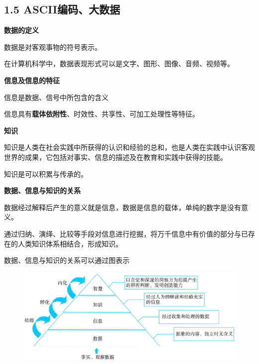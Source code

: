\setcounter{section}{1}
\setcounter{subsection}{2}
\subsection{1.5 ASCII编码、大数据}



\begin{compactenum}[1.]
\item \textbf{数据的定义}
	\begin{compactitem}
	\item 数据是对客观事物的符号表示。
	\item 在计算机科学中，数据表现形式可以是文字、图形、图像、音频、视频等。
	\end{compactitem}
\item \textbf{信息及信息的特征}
	\begin{compactitem}
	\item 信息是数据、信号中所包含的含义
	\item 信息具有\textbf{载体依附性}、时效性、共享性、可加工处理性等特征。
	\end{compactitem}
\item \textbf{知识}
	\begin{compactitem}
	\item 知识是人类在社会实践中所获得的认识和经验的总和，也是人类在实践中认识客观世界的成果，它包括对事实、信息的描述及在教育和实践中获得的技能。
	\item 知识是可以积累与传承的。
	\end{compactitem}
\item \textbf{数据、信息与知识的关系}
	\begin{compactitem}
	\item 数据经过解释后产生的意义就是信息，数据是信息的载体，单纯的数字是没有意义。
	\item 通过归纳、演绎、比较等手段对信息进行挖掘，将万千信息中有价值的部分与已存在的人类知识体系相结合，形成知识。
	\item 数据、信息与知识的关系可以通过图表示
	\end{compactitem}
\begin{figure}[!ht]
\centering
\includegraphics[width=0.5\linewidth]{pic/c01.01.info.knowledge}
\end{figure}



\end{compactenum}
